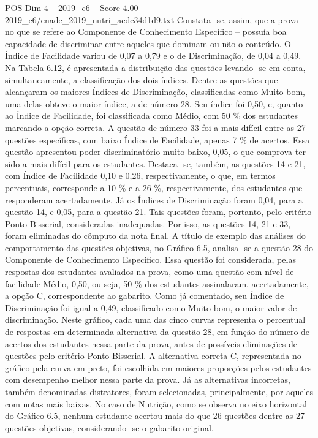 \begin{textsample}{POS Dim 4 – 2019\_c6 – Score 4.00 – 2019\_c6/enade\_2019\_nutri\_acdc34d1d9.txt}
Constata -se, assim, que a prova – no que se refere ao Componente de Conhecimento Específico – possuía boa capacidade de discriminar entre aqueles que dominam ou não o conteúdo.
O Índice de Facilidade variou de 0,07 a 0,79 e o de Discriminação, de 0,04 a 0,49.
Na Tabela 6.12, é apresentada a distribuição das questões levando -se em conta, simultaneamente, a classificação dos dois índices.
Dentre as questões que alcançaram os maiores Índices de Discriminação, classificadas como Muito bom, uma delas obteve o maior índice, a de número 28.
Seu índice foi 0,50, e, quanto ao Índice de Facilidade, foi classificada como Médio, com 50 \% dos estudantes marcando a opção correta.
A questão de número 33 foi a mais difícil entre as 27 questões específicas, com baixo Índice de Facilidade, apenas 7 \% de acertos.
Essa questão apresentou poder discriminatório muito baixo, 0,05, o que comprova ter sido a mais difícil para os estudantes.
Destaca -se, também, as questões 14 e 21, com Índice de Facilidade 0,10 e 0,26, respectivamente, o que, em termos percentuais, corresponde a 10 \% e a 26 \%, respectivamente, dos estudantes que responderam acertadamente.
Já os Índices de Discriminação foram 0,04, para a questão 14, e 0,05, para a questão 21.
Tais questões foram, portanto, pelo critério Ponto-Bisserial, consideradas inadequadas.
Por isso, as questões 14, 21 e 33, foram eliminadas do cômputo da nota final.
A título de exemplo das análises do comportamento das questões objetivas, no Gráfico 6.5, analisa -se a questão 28 do Componente de Conhecimento Específico.
Essa questão foi considerada, pelas respostas dos estudantes avaliados na prova, como uma questão com nível de facilidade Médio, 0,50, ou seja, 50 \% dos estudantes assinalaram, acertadamente, a opção C, correspondente ao gabarito.
Como já comentado, seu Índice de Discriminação foi igual a 0,49, classificado como Muito bom, o maior valor de discriminação.
Neste gráfico, cada uma das cinco curvas representa o percentual de respostas em determinada alternativa da questão 28, em função do número de acertos dos estudantes nessa parte da prova, antes de possíveis eliminações de questões pelo critério Ponto-Bisserial.
A alternativa correta C, representada no gráfico pela curva em preto, foi escolhida em maiores proporções pelos estudantes com desempenho melhor nessa parte da prova.
Já as alternativas incorretas, também denominadas distratores, foram selecionadas, principalmente, por aqueles com notas mais baixas.
No caso de Nutrição, como se observa no eixo horizontal do Gráfico 6.5, nenhum estudante acertou mais do que 26 questões dentre as 27 questões objetivas, considerando -se o gabarito original.

\end{textsample}
